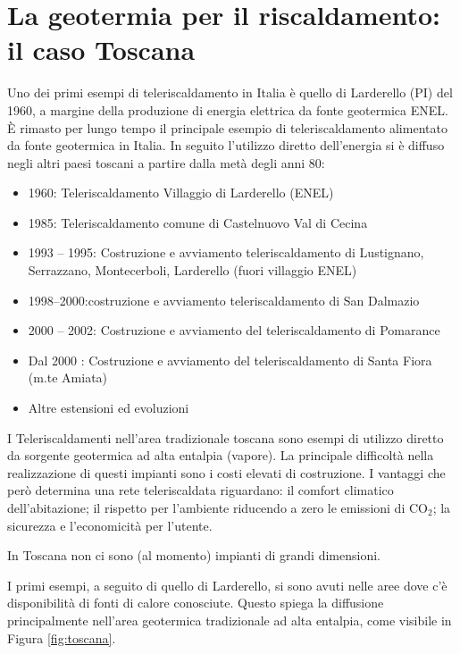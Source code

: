 \documentclass[laurea,oneside,11pt]{USiena_tesiLM}
\begin{document}
\section{La geotermia per il riscaldamento: il caso Toscana}
Uno dei primi esempi di teleriscaldamento in Italia è quello di Larderello (PI) del 1960, a margine della produzione di energia elettrica da fonte geotermica ENEL. È rimasto per lungo tempo il principale esempio di teleriscaldamento alimentato da fonte geotermica in Italia.
In seguito l'utilizzo diretto dell'energia si è diffuso negli altri paesi toscani a partire dalla metà degli anni 80: 
\begin{itemize}
\item 1960: Teleriscaldamento Villaggio di Larderello
(ENEL)
\item 1985: Teleriscaldamento comune di Castelnuovo Val di Cecina
\item 1993 – 1995: Costruzione e avviamento teleriscaldamento di Lustignano, Serrazzano, Montecerboli, Larderello (fuori villaggio ENEL)
\item 1998–2000:costruzione e avviamento teleriscaldamento di San Dalmazio
\item 2000 – 2002: Costruzione e avviamento del teleriscaldamento di Pomarance
\item Dal 2000 : Costruzione e avviamento del teleriscaldamento di Santa Fiora (m.te Amiata)
\item Altre estensioni ed evoluzioni
\end{itemize}

I Teleriscaldamenti nell'area tradizionale toscana sono esempi di utilizzo diretto da sorgente geotermica ad alta entalpia (vapore). La principale difficoltà nella realizzazione di questi impianti sono i costi elevati di costruzione. I vantaggi che però determina una rete teleriscaldata riguardano: il comfort climatico dell'abitazione; il rispetto per l'ambiente riducendo a zero le emissioni di CO$_2$; la sicurezza e l'economicità per l'utente. 

In Toscana non ci sono (al momento) impianti di grandi dimensioni.

I primi esempi, a seguito di quello di Larderello, si sono avuti nelle aree dove c'è disponibilità di fonti di calore conosciute.
Questo spiega la diffusione principalmente nell'area geotermica tradizionale ad alta entalpia, come visibile in Figura \ref{fig:toscana}.
\end{document}
